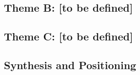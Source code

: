 \subsection{Theme B: [to be defined]}
\label{sec:sota-theme-b}

\subsection{Theme C: [to be defined]}
\label{sec:sota-theme-c}

\subsection{Synthesis and Positioning}
\label{sec:sota-synthesis}
